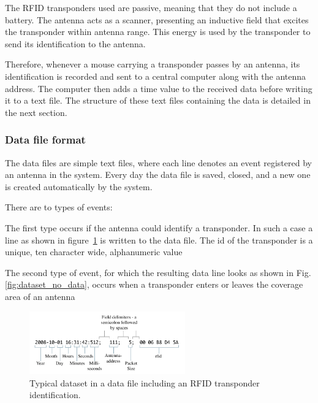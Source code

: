 The RFID transponders used are passive, meaning that they do not include a battery. The antenna acts as a scanner, presenting an inductive field that excites the transponder within antenna range. This energy is used by the transponder to send its identification to the antenna. 

Therefore, whenever a mouse carrying a transponder passes by an antenna, its identification is recorded and sent to a central computer along with the antenna address. The computer then adds a time value to the received data before writing it to a text file. The structure of these text files containing the data is detailed in the next section.

\subsubsection{Data file format}
\label{subsubsec:datafileformat}
The data files are simple text files, where each line denotes an event registered by an antenna in the system. Every day the data file is saved, closed, and a new one is created automatically by the system.

There are to types of events: %
\begin{mylist}
 \item The first type occurs if the antenna could identify a transponder. In such a case a line as shown in figure~\ref{fig:dataset} is written to the data file. The id of the transponder is a unique, ten character wide, alphanumeric value
 \item The second type of event, for which the resulting data line looks as shown in Fig. \ref{fig:dataset_no_data}, occurs when a transponder enters or leaves the coverage area of an antenna
 \item 
\end{mylist}

\begin{figure}[!htbp]	
\centering	
\includegraphics[width=0.6\textwidth]{assets/pdf/dataset.pdf}	
\caption[Dataset including an RFID transponder identification]{Typical dataset in a data file including an RFID transponder identification.}
\label{fig:dataset}
\end{figure}

